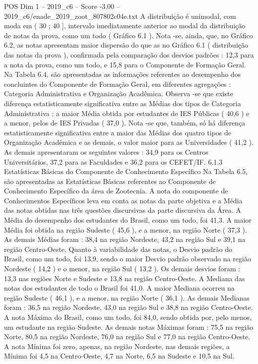 \begin{textsample}{POS Dim 1 – 2019\_c6 – Score -3.00 – 2019\_c6/enade\_2019\_zoot\_807802c04e.txt}
A distribuição é unimodal, com moda em ( 30 ; 40 ], intervalo imediatamente anterior ao modal da distribuição de notas da prova, como um todo ( Gráfico 6.1 ).
Nota -se, ainda, que, no Gráfico 6.2, as notas apresentam maior dispersão do que as no Gráfico 6.1 ( distribuição das notas da prova ), confirmada pela comparação dos desvios padrões : 12,3 para a nota da prova, como um todo, e 15,8 para o Componente de Formação Geral.
Na Tabela 6.4, são apresentadas as informações referentes ao desempenho dos concluintes do Componente de Formação Geral, em diferentes agregações : Categoria Administrativa e Organização Acadêmica.
Observa -se que existe diferença estatisticamente significativa entre as Médias dos tipos de Categoria Administrativa : a maior Média obtida por estudantes de IES Públicas ( 40,6 ) e a menor, pelos de IES Privadas ( 37,0 ).
Nota -se que, também, só há diferença estatisticamente significativa entre a maior das Médias dos quatro tipos de Organização Acadêmica e as demais, o valor maior para as Universidades ( 41,2 ).
As demais apresentaram os seguintes valores : 34,9 para os Centros Universitários, 37,2 para as Faculdades e 36,2 para os CEFET/IF. 6.1.3 Estatísticas Básicas do Componente de Conhecimento Específico Na Tabela 6.5, são apresentadas as Estatísticas Básicas referentes ao Componente de Conhecimento Específico da área de Zootecnia.
A nota do componente de Conhecimentos Específicos leva em conta as notas da parte objetiva e a Média das notas obtidas nas três questões discursivas da parte discursiva da Área.
A Média do desempenho dos estudantes do Brasil, como um todo, foi 41,3.
A maior Média foi obtida na região Sudeste ( 45,6 ), e a menor, na região Norte ( 37,3 ).
As demais Médias foram : 38,4 na região Nordeste, 43,2 na região Sul e 39,1 na região Centro-Oeste.
Quanto à variabilidade das notas, o Desvio padrão do Brasil, como um todo, foi 13,9, sendo o maior Desvio padrão observado na região Nordeste ( 14,2 ) e o menor, na região Sul ( 13,2 ).
Os demais desvios foram : 13,3 nas regiões Norte e Sudeste e 13,8 na região Centro-Oeste.
A Mediana das notas dos estudantes de todo o Brasil foi 41,0.
A maior Mediana ocorreu na região Sudeste ( 46,1 ), e a menor, na região Norte ( 36,1 ).
As demais Medianas foram : 36,5 na região Nordeste, 43,0 na região Sul e 38,8 na região Centro-Oeste.
A nota Máxima do Brasil, como um todo, foi 84,0, sendo obtida por, pelo menos, um estudante na região Sudeste.
As demais notas Máximas foram : 75,5 na região Norte, 80,5 na região Nordeste, 76,0 na região Sul e 77,0 na região Centro-Oeste.
A nota Mínima foi zero, apenas, na região Nordeste, nas demais regiões, a Mínima foi 4,5 na Centro-Oeste, 4,7 na Norte, 6,5 na Sudeste e 10,5 na Sul.

\end{textsample}

